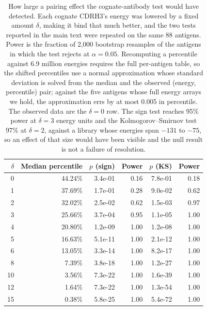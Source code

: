 \documentclass[11pt,a4paper]{article}
\begin{document}
\begin{table}[h]
\caption{How large a pairing effect the cognate-antibody test would have detected. Each cognate CDRH3's energy was lowered by a fixed amount $\delta$, making it bind that much better, and the two tests reported in the main text were repeated on the same 88 antigens. Power is the fraction of 2{,}000 bootstrap resamples of the antigens in which the test rejects at $\alpha = 0.05$. Recomputing a percentile against 6.9 million energies requires the full per-antigen table, so the shifted percentiles use a normal approximation whose standard deviation is solved from the median and the observed (energy, percentile) pair; against the five antigens whose full energy arrays we hold, the approximation errs by at most 0.005 in percentile. The observed data are the $\delta = 0$ row. The sign test reaches 95\% power at $\delta = 3$ energy units and the Kolmogorov--Smirnov test 97\% at $\delta = 2$, against a library whose energies span $-131$ to $-75$, so an effect of that size would have been visible and the null result is not a failure of resolution.}
\centering
\begin{tabular}{@{}rrrrrr@{}}
\toprule
$\delta$ & Median percentile & $p$ (sign) & Power & $p$ (KS) & Power \\
\midrule
0 & 44.24\% & 3.4e-01 & 0.16 & 7.8e-01 & 0.18 \\
1 & 37.69\% & 1.7e-01 & 0.28 & 9.0e-02 & 0.62 \\
2 & 32.02\% & 2.5e-02 & 0.62 & 1.5e-03 & 0.97 \\
3 & 25.66\% & 3.7e-04 & 0.95 & 1.1e-05 & 1.00 \\
4 & 20.80\% & 1.2e-09 & 1.00 & 1.2e-08 & 1.00 \\
5 & 16.63\% & 5.1e-11 & 1.00 & 2.1e-12 & 1.00 \\
6 & 13.05\% & 3.3e-14 & 1.00 & 8.2e-17 & 1.00 \\
8 & 7.39\% & 3.8e-18 & 1.00 & 1.2e-27 & 1.00 \\
10 & 3.56\% & 7.3e-22 & 1.00 & 1.6e-39 & 1.00 \\
12 & 1.64\% & 7.3e-22 & 1.00 & 1.3e-54 & 1.00 \\
15 & 0.38\% & 5.8e-25 & 1.00 & 5.4e-72 & 1.00 \\
\bottomrule
\end{tabular}
\end{table}
\end{document}
